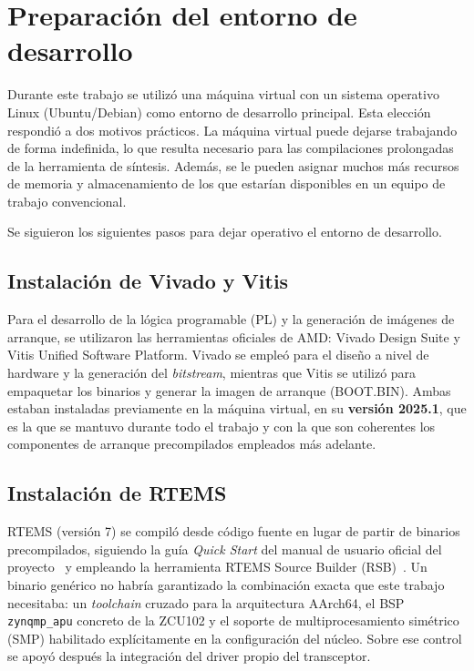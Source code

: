 
\section{Preparación del entorno de desarrollo}

Durante este trabajo se utilizó una máquina virtual con un sistema operativo Linux
(Ubuntu/Debian) como entorno de desarrollo principal. Esta elección respondió a dos
motivos prácticos. La máquina virtual puede dejarse trabajando de forma indefinida, lo
que resulta necesario para las compilaciones prolongadas de la herramienta de síntesis.
Además, se le pueden asignar muchos más recursos de memoria y almacenamiento de los que
estarían disponibles en un equipo de trabajo convencional.

Se siguieron los siguientes pasos para dejar operativo el
entorno de desarrollo.

\subsection{Instalación de Vivado y Vitis}

Para el desarrollo de la lógica programable (PL) y la generación de imágenes de arranque, se
utilizaron las herramientas oficiales de AMD: Vivado Design Suite y Vitis Unified
Software Platform. Vivado se empleó para el diseño a nivel de hardware y la generación del
\textit{bitstream}, mientras que Vitis se utilizó para empaquetar los binarios y generar la imagen de
arranque (BOOT.BIN). Ambas estaban instaladas previamente en la máquina virtual, en su
\textbf{versión 2025.1}, que es la que se mantuvo durante todo el trabajo y con la que son
coherentes los componentes de arranque precompilados empleados más adelante.

\subsection{Instalación de RTEMS}

RTEMS (versión 7) se compiló desde código fuente en lugar de partir de binarios precompilados,
siguiendo la guía \textit{Quick Start} del manual de usuario oficial del
proyecto~\cite{rtems_quickstart} y empleando la herramienta RTEMS Source Builder
(RSB)~\cite{rtems_rsb}. Un binario genérico no habría garantizado la combinación exacta que este
trabajo necesitaba: un \textit{toolchain} cruzado para la arquitectura AArch64, el BSP
\texttt{zynqmp\_apu} concreto de la ZCU102 y el soporte de multiprocesamiento simétrico (SMP)
habilitado explícitamente en la configuración del núcleo. Sobre ese control se apoyó después la
integración del driver propio del transceptor.

